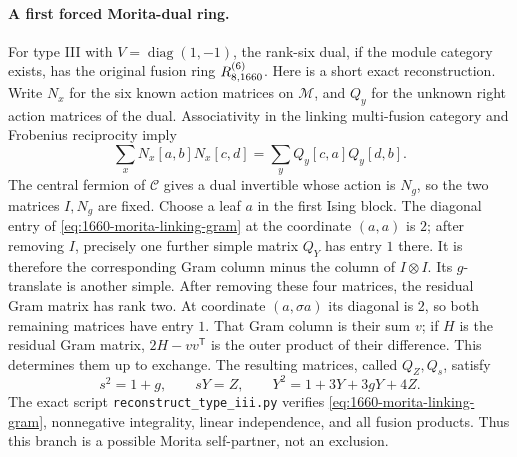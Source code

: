 \paragraph{A first forced Morita-dual ring.}
For type III with $V=\operatorname{diag}(1,-1)$, the rank-six dual,
if the module category exists, has the original fusion ring
$R^{(6)}_{8,1660}$. Here is a short exact reconstruction.
Write $N_x$ for the six known action matrices on $\mathcal M$, and $Q_y$ for
the unknown right action matrices of the dual. Associativity in the
linking multi-fusion category and Frobenius reciprocity imply
\begin{equation}
\sum_x N_x[a,b]N_x[c,d]
 =\sum_y Q_y[c,a]Q_y[d,b]. \label{eq:1660-morita-linking-gram}
\end{equation}
The central fermion of $\mathcal C$ gives a dual invertible whose action is
$N_g$, so the two matrices $I,N_g$ are fixed. Choose a leaf $a$ in the
first Ising block. The diagonal entry of \eqref{eq:1660-morita-linking-gram} at the coordinate $(a,a)$
is $2$; after removing $I$, precisely one further simple matrix $Q_Y$
has entry $1$ there. It is therefore the corresponding Gram column
minus the column of $I\otimes I$. Its $g$-translate is another simple.
After removing these four matrices, the residual Gram matrix has rank
two. At coordinate $(a,\sigma a)$ its diagonal is $2$, so both remaining
matrices have entry $1$. That Gram column is their sum $v$; if $H$ is
the residual Gram matrix, $2H-vv^{\mathsf T}$ is the outer product of
their difference. This determines them up to exchange.
The resulting matrices, called $Q_Z,Q_s$, satisfy
\[
s^2=1+g,\qquad sY=Z,\qquad
Y^2=1+3Y+3gY+4Z.
\]
The exact script \texttt{reconstruct\_type\_iii.py} verifies \eqref{eq:1660-morita-linking-gram},
nonnegative integrality, linear independence, and all fusion products.
Thus this branch is a possible Morita self-partner, not an exclusion.

